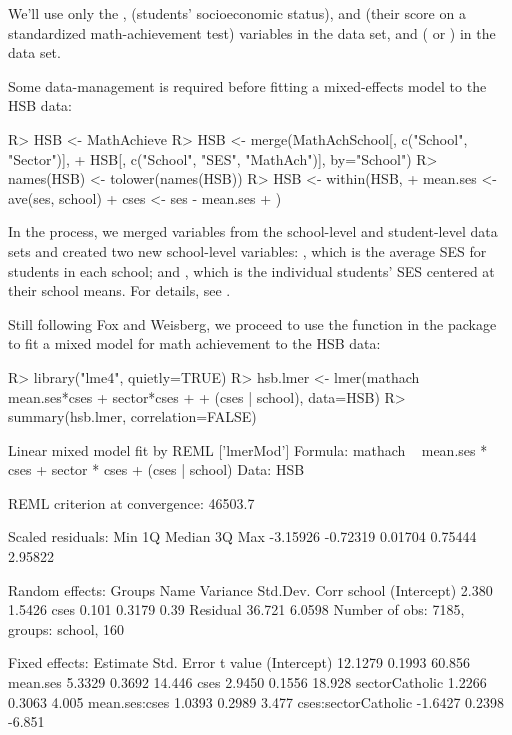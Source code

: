 \documentclass[
]{jss}
\begin{document}
We'll use only the ,  (students' socioeconomic
status), and  (their score on a standardized
math-achievement test) variables in the  data set, and
 ( or ) in the
 data set.

Some data-management is required before fitting a mixed-effects model to
the HSB data:

\begin{CodeChunk}
\begin{CodeInput}
R> HSB <- MathAchieve
R> HSB <- merge(MathAchSchool[, c("School", "Sector")],
+              HSB[, c("School", "SES", "MathAch")], by="School")
R> names(HSB) <- tolower(names(HSB))
R> HSB <- within(HSB, {
+   mean.ses <- ave(ses, school)
+   cses <- ses - mean.ses
+ })
\end{CodeInput}
\end{CodeChunk}

In the process, we merged variables from the school-level and
student-level data sets and created two new school-level variables:
, which is the average SES for students in each school;
and , which is the individual students' SES centered at their
school means. For details, see \citet[Sec. 7.2.2]{FoxWeisberg:2019}.

Still following Fox and Weisberg, we proceed to use the 
function in the  package \citep{BatesEtAl:2015} to fit a mixed
model for math achievement to the HSB data:

\begin{CodeChunk}
\begin{CodeInput}
R> library("lme4", quietly=TRUE)
R> hsb.lmer <- lmer(mathach ~ mean.ses*cses + sector*cses
+                    + (cses | school), data=HSB)
R> summary(hsb.lmer, correlation=FALSE)
\end{CodeInput}
\begin{CodeOutput}
Linear mixed model fit by REML ['lmerMod']
Formula: mathach ~ mean.ses * cses + sector * cses + (cses | school)
   Data: HSB

REML criterion at convergence: 46503.7

Scaled residuals: 
     Min       1Q   Median       3Q      Max 
-3.15926 -0.72319  0.01704  0.75444  2.95822 

Random effects:
 Groups   Name        Variance Std.Dev. Corr
 school   (Intercept)  2.380   1.5426       
          cses         0.101   0.3179   0.39
 Residual             36.721   6.0598       
Number of obs: 7185, groups:  school, 160

Fixed effects:
                    Estimate Std. Error t value
(Intercept)          12.1279     0.1993  60.856
mean.ses              5.3329     0.3692  14.446
cses                  2.9450     0.1556  18.928
sectorCatholic        1.2266     0.3063   4.005
mean.ses:cses         1.0393     0.2989   3.477
cses:sectorCatholic  -1.6427     0.2398  -6.851
\end{CodeOutput}
\end{CodeChunk}
\end{document}
